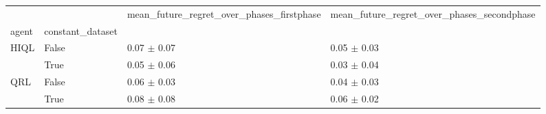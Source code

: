 \begin{tabular}{llll}
\toprule
 &  & mean_future_regret_over_phases_firstphase & mean_future_regret_over_phases_secondphase \\
agent & constant_dataset &  &  \\
\midrule
\multirow[t]{2}{*}{HIQL} & False & 0.07 $\pm$ 0.07 & 0.05 $\pm$ 0.03 \\
 & True & 0.05 $\pm$ 0.06 & 0.03 $\pm$ 0.04 \\
\cline{1-4}
\multirow[t]{2}{*}{QRL} & False & 0.06 $\pm$ 0.03 & 0.04 $\pm$ 0.03 \\
 & True & 0.08 $\pm$ 0.08 & 0.06 $\pm$ 0.02 \\
\cline{1-4}
\bottomrule
\end{tabular}
